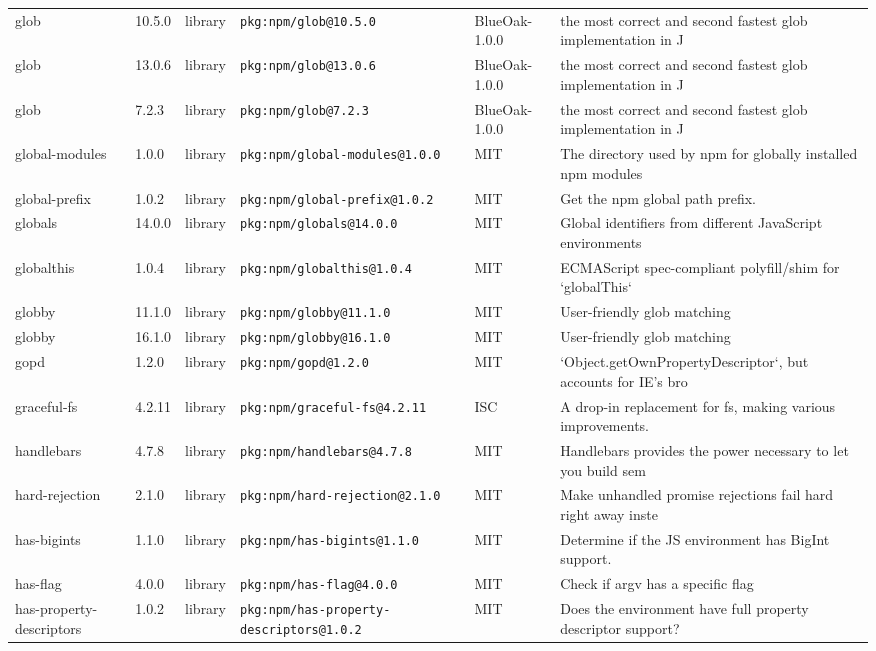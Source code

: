 \documentclass[11pt]{article}
\begin{document}
\begin{longtable}{|l|l|l|p{2.2cm}|l|p{4cm}|}
glob & 10.5.0 & library & \texttt{pkg:npm/glob@10.5.0} & BlueOak-1.0.0 & the most correct and second fastest glob implementation in J \\
glob & 13.0.6 & library & \texttt{pkg:npm/glob@13.0.6} & BlueOak-1.0.0 & the most correct and second fastest glob implementation in J \\
glob & 7.2.3 & library & \texttt{pkg:npm/glob@7.2.3} & BlueOak-1.0.0 & the most correct and second fastest glob implementation in J \\
global-modules & 1.0.0 & library & \texttt{pkg:npm/global-modules@1.0.0} & MIT & The directory used by npm for globally installed npm modules \\
global-prefix & 1.0.2 & library & \texttt{pkg:npm/global-prefix@1.0.2} & MIT & Get the npm global path prefix. \\
globals & 14.0.0 & library & \texttt{pkg:npm/globals@14.0.0} & MIT & Global identifiers from different JavaScript environments \\
globalthis & 1.0.4 & library & \texttt{pkg:npm/globalthis@1.0.4} & MIT & ECMAScript spec-compliant polyfill/shim for `globalThis` \\
globby & 11.1.0 & library & \texttt{pkg:npm/globby@11.1.0} & MIT & User-friendly glob matching \\
globby & 16.1.0 & library & \texttt{pkg:npm/globby@16.1.0} & MIT & User-friendly glob matching \\
gopd & 1.2.0 & library & \texttt{pkg:npm/gopd@1.2.0} & MIT & `Object.getOwnPropertyDescriptor`, but accounts for IE's bro \\
graceful-fs & 4.2.11 & library & \texttt{pkg:npm/graceful-fs@4.2.11} & ISC & A drop-in replacement for fs, making various improvements. \\
handlebars & 4.7.8 & library & \texttt{pkg:npm/handlebars@4.7.8} & MIT & Handlebars provides the power necessary to let you build sem \\
hard-rejection & 2.1.0 & library & \texttt{pkg:npm/hard-rejection@2.1.0} & MIT & Make unhandled promise rejections fail hard right away inste \\
has-bigints & 1.1.0 & library & \texttt{pkg:npm/has-bigints@1.1.0} & MIT & Determine if the JS environment has BigInt support. \\
has-flag & 4.0.0 & library & \texttt{pkg:npm/has-flag@4.0.0} & MIT & Check if argv has a specific flag \\
has-property-descriptors & 1.0.2 & library & \texttt{pkg:npm/has-property-descriptors@1.0.2} & MIT & Does the environment have full property descriptor support?  \\

\end{longtable}
\end{document}
